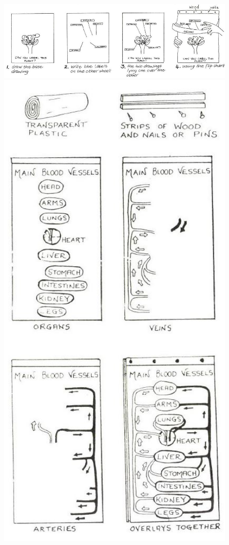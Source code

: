 \begin{center}
\includegraphics[width=12cm]{./img/vso/transparent-display.jpg}
\includegraphics[width=12cm]{./img/source/transparent-display.jpg}
\end{center}

